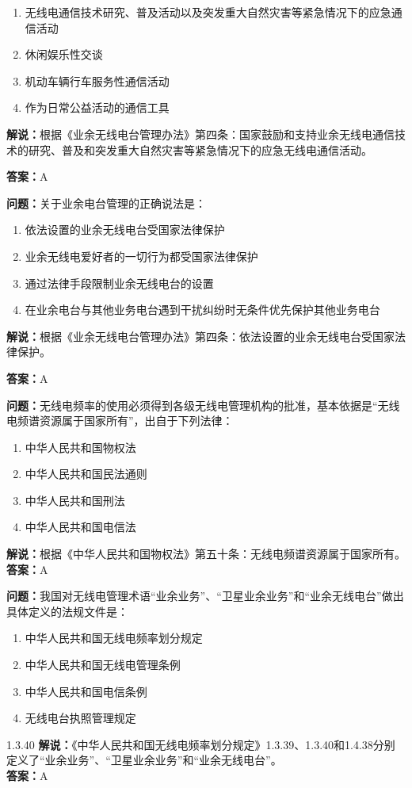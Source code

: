 \documentclass[UTF8]{ctexbook}
\begin{document}
\begin{enumerate}[label=\Alph*), leftmargin=3em]
  \item 无线电通信技术研究、普及活动以及突发重大自然灾害等紧急情况下的应急通信活动
  \item 休闲娱乐性交谈
  \item 机动车辆行车服务性通信活动
  \item 作为日常公益活动的通信工具
\end{enumerate}

\textbf{解说：}根据《业余无线电台管理办法》第四条：国家鼓励和支持业余无线电通信技术的研究、普及和突发重大自然灾害等紧急情况下的应急无线电通信活动。

\textbf{答案：}A

\textbf{问题：}关于业余电台管理的正确说法是：

\begin{enumerate}[label=\Alph*), leftmargin=3em]
  \item 依法设置的业余无线电台受国家法律保护
  \item 业余无线电爱好者的一切行为都受国家法律保护
  \item 通过法律手段限制业余无线电台的设置
  \item 在业余电台与其他业务电台遇到干扰纠纷时无条件优先保护其他业务电台
\end{enumerate}
\textbf{解说：}根据《业余无线电台管理办法》第四条：依法设置的业余无线电台受国家法律保护。

\textbf{答案：}A

\textbf{问题：}无线电频率的使用必须得到各级无线电管理机构的批准，基本依据是“无线电频谱资源属于国家所有”，出自于下列法律：

\begin{enumerate}[label=\Alph*), leftmargin=3em]
  \item 中华人民共和国物权法
  \item 中华人民共和国民法通则
  \item 中华人民共和国刑法
  \item 中华人民共和国电信法
\end{enumerate}
\textbf{解说：}根据《中华人民共和国物权法》第五十条：无线电频谱资源属于国家所有。\\
\textbf{答案：}A

\textbf{问题：}我国对无线电管理术语“业余业务”、“卫星业余业务”和“业余无线电台”做出具体定义的法规文件是：
\begin{enumerate}[label=\Alph*), leftmargin=3em]
  \item 中华人民共和国无线电频率划分规定
  \item 中华人民共和国无线电管理条例
  \item 中华人民共和国电信条例
  \item 无线电台执照管理规定
\end{enumerate}1.3.40
\textbf{解说：}《中华人民共和国无线电频率划分规定》1.3.39、1.3.40和1.4.38分别定义了“业余业务”、“卫星业余业务”和“业余无线电台”。\\
\textbf{答案：}A
\end{document}
